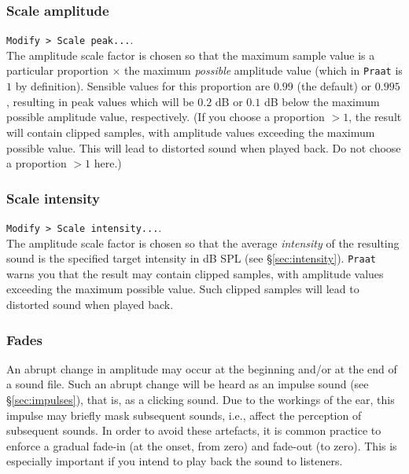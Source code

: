 \documentclass[
]{book}
\begin{document}
\label{box-praatscale}
\subsubsection{Scale amplitude}\label{scale-amplitude}

\texttt{Modify\ \textgreater{}\ Scale\ peak...}.\\
The amplitude scale factor is chosen so that the maximum sample value is a particular proportion \(\times\) the maximum \emph{possible} amplitude value (which in \texttt{Praat} is \(1\) by definition). Sensible values for this proportion are \(0.99\) (the default) or \(0.995\), resulting in peak values which will be \(0.2\) dB or \(0.1\) dB below the maximum possible amplitude value, respectively. (If you choose a proportion \(>1\), the result will contain clipped samples, with amplitude values exceeding the maximum possible value. This will lead to distorted sound when played back. Do not choose a proportion \(>1\) here.)

\subsubsection{Scale intensity}\label{scale-intensity}

\texttt{Modify\ \textgreater{}\ Scale\ intensity...}.\\
The amplitude scale factor is chosen so that the average \emph{intensity} of the resulting sound is the specified target intensity in dB SPL (see §\ref{sec:intensity}). \texttt{Praat} warns you that the result may contain clipped samples, with amplitude values exceeding the maximum possible value. Such clipped samples will lead to distorted sound when played back.

\label{fades}
\subsubsection{Fades}\label{sec:fades}

An abrupt change in amplitude may occur at the beginning and/or at the end of a sound file. Such an abrupt change will be heard as an impulse sound (see §\ref{sec:impulses}), that is, as a clicking sound. Due to the workings of the ear, this impulse may briefly mask subsequent sounds, i.e., affect the perception of subsequent sounds. In order to avoid these artefacts, it is common practice to enforce a gradual fade-in (at the onset, from zero) and fade-out (to zero). This is especially important if you intend to play back the sound to listeners.
\end{document}

